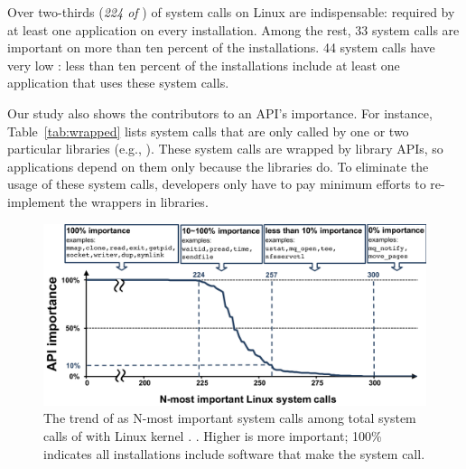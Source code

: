 Over two-thirds ({\em 224 of \syscallnum{}}) 
of system calls on Linux are indispensable:
required by 
at least one application on every installation.
Among the rest, 33 system calls are important on more than ten percent of the installations.
44 system calls have very low \usagemetric{}:
less than ten percent of the installations include at least one application
that uses these system calls.

Our study also shows the contributors
to an API's importance. %
For instance, Table~\ref{tab:wrapped} lists system calls that are
only called by one or two particular libraries
(e.g., \libc{}).
These system calls are wrapped by library APIs,
so applications depend on them only because the libraries do.
To eliminate the usage of these system calls,
developers only have to pay minimum efforts to re-implement the wrappers in libraries.

\begin{figure}[t]
\centering
\includegraphics[width=6in]{syspop/figures/syscall-popularity-all-by-inst.pdf}
\caption[N-most important system calls in Linux.]
{The trend of \usagemetric{} as N-most important system calls among total \syscallnum{} system calls of \osversion{} with Linux kernel . .
Higher is more important; 100\% indicates all installations include software that make the system call.}
\label{fig:syscall-popularity-trend}
\end{figure}

